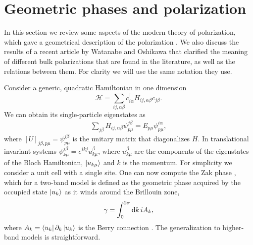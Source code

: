 \documentclass[twocolumn,amsmath,longbibliography,amssymb,superscriptaddress]{revtex4-1}
\begin{document}
\section{Geometric phases and polarization}

In this section we review some aspects of the modern theory of polarization, which gave a geometrical description of the polarization \cite{Resta1992,KingSmith1993,Vanderbilt1993,Resta1997}. 
We also discuss the results of a recent article by Watanabe and Oshikawa \cite{Watanabe2018} that clarified the meaning of different bulk polarizations that are found in the literature, as well as the relations between them. For clarity we will use the same notation they use. 

Consider a generic, quadratic Hamiltonian in one dimension
\begin{equation}\label{eq:quadr_Ham}
\mathcal{H} = \sum_{ij,\alpha\beta} c_{i\alpha}^\dagger H_{ij,\alpha \beta}c_{j\beta}.
\end{equation}
We can obtain its single-particle eigenstates as
\begin{align}
\sum_{j\beta}H_{ij,\alpha\beta} \psi_{p\mu}^{j\beta} = E_{p\mu} \psi^{i\alpha}_{p\mu},
\end{align}
where $[U]_{j\beta,p\mu} = \psi_{p\mu}^{j\beta}$ is the unitary matrix that diagonalizes $H$. In translational invariant systems $\psi_{k\mu}^{j\beta} = e^{ikj}u_{k \mu}^{\beta}$, where $u_{k \mu}^{\beta}$ are the components of the eigenstates of the Bloch Hamiltonian, $\ket{u_{k\mu}}$ and $k$ is the momentum. For simplicity we consider a unit cell with a single site. One can now compute the Zak phase \cite{Zak1989}, which for a two-band  model is defined as the geometric phase acquired by the occupied state $\ket{u_k}$ as it winds around the Brillouin zone,
\begin{equation}
\gamma = \int_{0}^{2\pi} {\rm d}k\, i A_k, 
\label{eq:zak_phase}
\end{equation}
where $A_k = \bra{u_k}\partial_k \ket{u_k}$ is the Berry connection \cite{Berry1984}. 
The generalization to higher-band models is straightforward. 
\end{document}
